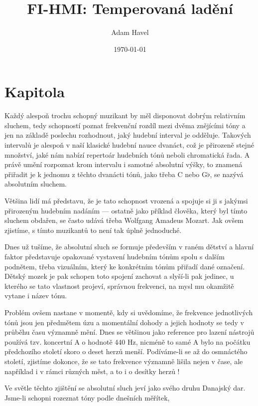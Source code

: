 \documentclass[12pt]{article}
\title{FI-HMI: Temperovaná ladění}
\date{\today}
\author{Adam Havel}
\begin{document}
\maketitle

\section{Kapitola}
Každý alespoň trochu schopný muzikant by měl disponovat dobrým relativním sluchem, tedy schopností poznat frekvenční rozdíl mezi dvěma znějícími tóny a jen na základě poslechu rozhodnout, jaký hudební interval je odděluje. Takových intervalů je alespoň v naší klasické hudební nauce dvanáct, což je přirozeně stejné množství, jaké nám nabízí repertoár hudebních tónů neboli chromatická řada. A právě umění rozpoznat krom intervalu i samotné absolutní výšky, to znamená přiřadit je k jednomu z těchto dvanácti tónů, jako třeba C nebo G$\flat$, se nazývá absolutním sluchem.

Většina lidí má představu, že je tato schopnost vrozená a spojuje si ji s jakýmsi přirozeným hudebním nadáním — ostatně jako příklad člověka, který byl tímto sluchem obdařen, se často udává třeba Wolfgang Amadeus Mozart. Jak ovšem zjistíme, s tímto  muzikantů to není tak úplně jednoduché.

Dnes už tušíme, že absolutní sluch se formuje především v raném dětství a hlavní faktor představuje opakované vystavení hudebním tónům spolu s dalším podnětem, třeba vizuálním, který ke konkrétním tónům přiřadí dané označení. Dětský mozek je pak schopen toto spojení zachovat a slyší-li pak jedinec, u kterého se tato vlastnost projeví, správnou frekvenci, na mysl mu okamžitě vytane i název tónu.

Problém ovšem nastane v momentě, kdy si uvědomíme, že frekvence jednotlivých tónů jsou jen předmětem úzu a momentální dohody a jejich hodnoty se tedy v průběhu času významně mění. Dnes se většinou jako reference pro lazení nástrojů používá tzv. koncertní A o hodnotě 440 Hz, nicméně to samé A bylo na počátku předchozího století skoro o deset herzů menší. Podíváme-li se až do osmnáctého století, zjistíme dokonce, že se tato frekvence významně lišila nejen v čase, ale například i v rámci různých měst, a to i o desítky herzů \cite{wiki_pitch}!

Ve světle těchto zjištění se absolutní sluch jeví jako svého druhu Danajský dar. Jsme-li schopni rozeznat tóny podle dnešních měřítek, 

\pagebreak
\end{document}
